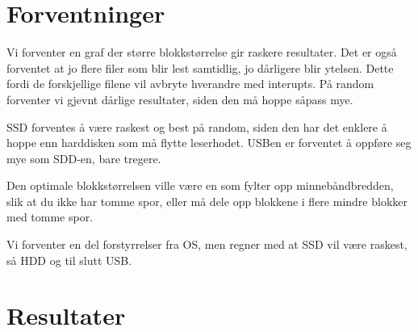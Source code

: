 \documentclass[titlepage]{article}
\begin{document}
\section{Forventninger}
Vi forventer en graf der større blokkstørrelse gir raskere
resultater. Det er også forventet at jo flere filer som blir lest
samtidlig, jo dårligere blir ytelsen. Dette fordi de forskjellige
filene vil avbryte hverandre med interupts.  På random forventer vi
gjevnt dårlige resultater, siden den må hoppe såpass mye.

 SSD forventes å være raskest og best på random, siden den har det
 enklere å hoppe enn harddisken som må flytte leserhodet. USBen er
 forventet å oppføre seg mye som SDD-en, bare tregere.

Den optimale blokkstørrelsen ville være en som fylter opp
minnebåndbredden, slik at du ikke har tomme spor, eller må dele opp
blokkene i flere mindre blokker med tomme spor.

Vi forventer en del forstyrrelser fra OS, men regner med at SSD vil
være raskest, så HDD og til slutt USB.


\section{Resultater}

\end{document}
